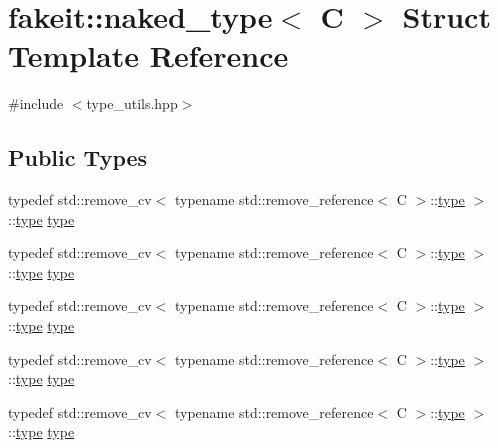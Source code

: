 \hypertarget{structfakeit_1_1naked__type}{}\section{fakeit\+::naked\+\_\+type$<$ C $>$ Struct Template Reference}
\label{structfakeit_1_1naked__type}


{\ttfamily \#include $<$type\+\_\+utils.\+hpp$>$}

\subsection*{Public Types}
\begin{DoxyCompactItemize}
\item 
typedef std\+::remove\+\_\+cv$<$ typename std\+::remove\+\_\+reference$<$ C $>$\+::\mbox{\hyperlink{structfakeit_1_1naked__type_a3248a6c417c3a06d6e93576085fe7fcc}{type}} $>$\+::\mbox{\hyperlink{structfakeit_1_1naked__type_a3248a6c417c3a06d6e93576085fe7fcc}{type}} \mbox{\hyperlink{structfakeit_1_1naked__type_a3248a6c417c3a06d6e93576085fe7fcc}{type}}
\item 
typedef std\+::remove\+\_\+cv$<$ typename std\+::remove\+\_\+reference$<$ C $>$\+::\mbox{\hyperlink{structfakeit_1_1naked__type_a3248a6c417c3a06d6e93576085fe7fcc}{type}} $>$\+::\mbox{\hyperlink{structfakeit_1_1naked__type_a3248a6c417c3a06d6e93576085fe7fcc}{type}} \mbox{\hyperlink{structfakeit_1_1naked__type_a3248a6c417c3a06d6e93576085fe7fcc}{type}}
\item 
typedef std\+::remove\+\_\+cv$<$ typename std\+::remove\+\_\+reference$<$ C $>$\+::\mbox{\hyperlink{structfakeit_1_1naked__type_a3248a6c417c3a06d6e93576085fe7fcc}{type}} $>$\+::\mbox{\hyperlink{structfakeit_1_1naked__type_a3248a6c417c3a06d6e93576085fe7fcc}{type}} \mbox{\hyperlink{structfakeit_1_1naked__type_a3248a6c417c3a06d6e93576085fe7fcc}{type}}
\item 
typedef std\+::remove\+\_\+cv$<$ typename std\+::remove\+\_\+reference$<$ C $>$\+::\mbox{\hyperlink{structfakeit_1_1naked__type_a3248a6c417c3a06d6e93576085fe7fcc}{type}} $>$\+::\mbox{\hyperlink{structfakeit_1_1naked__type_a3248a6c417c3a06d6e93576085fe7fcc}{type}} \mbox{\hyperlink{structfakeit_1_1naked__type_a3248a6c417c3a06d6e93576085fe7fcc}{type}}
\item 
typedef std\+::remove\+\_\+cv$<$ typename std\+::remove\+\_\+reference$<$ C $>$\+::\mbox{\hyperlink{structfakeit_1_1naked__type_a3248a6c417c3a06d6e93576085fe7fcc}{type}} $>$\+::\mbox{\hyperlink{structfakeit_1_1naked__type_a3248a6c417c3a06d6e93576085fe7fcc}{type}} \mbox{\hyperlink{structfakeit_1_1naked__type_a3248a6c417c3a06d6e93576085fe7fcc}{type}}

\end{DoxyCompactItemize}
